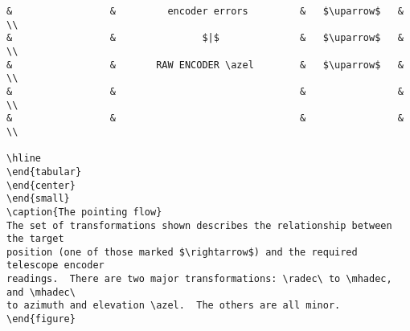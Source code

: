 {\begin{verbatim}
&                 &         encoder errors         &   $\uparrow$   & \\
&                 &               $|$              &   $\uparrow$   & \\
&                 &       RAW ENCODER \azel        &   $\uparrow$   & \\
&                 &                                &                & \\
&                 &                                &                & \\
                                                                      \hline
\end{tabular}
\end{center}
\end{small}
\caption{The pointing flow}
The set of transformations shown describes the relationship between the target
position (one of those marked $\rightarrow$) and the required telescope encoder
readings.  There are two major transformations: \radec\ to \mhadec, and \mhadec\
to azimuth and elevation \azel.  The others are all minor.
\end{figure}

\end{verbatim}
}

\newpage

